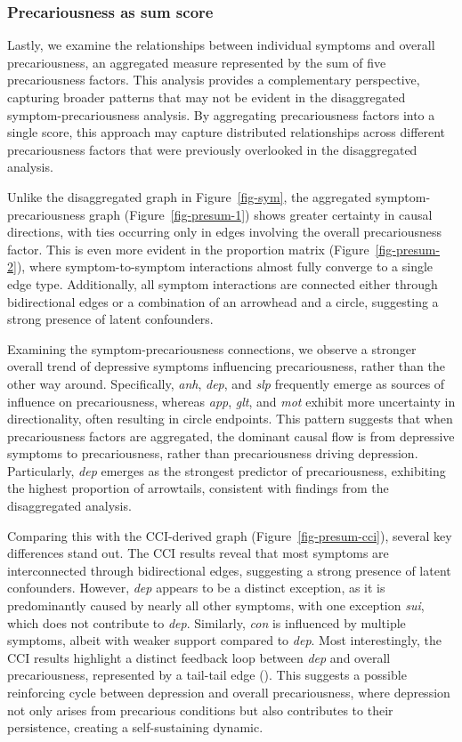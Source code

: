 \documentclass[
]{article}
\begin{document}
\subsubsection{Precariousness as sum
score}\label{precariousness-as-sum-score}

Lastly, we examine the relationships between individual symptoms and
overall precariousness, an aggregated measure represented by the sum of
five precariousness factors. This analysis provides a complementary
perspective, capturing broader patterns that may not be evident in the
disaggregated symptom-precariousness analysis. By aggregating
precariousness factors into a single score, this approach may capture
distributed relationships across different precariousness factors that
were previously overlooked in the disaggregated analysis.

Unlike the disaggregated graph in Figure~\ref{fig-sym}, the aggregated
symptom-precariousness graph (Figure~\ref{fig-presum-1}) shows greater
certainty in causal directions, with ties occurring only in edges
involving the overall precariousness factor. This is even more evident
in the proportion matrix (Figure~\ref{fig-presum-2}), where
symptom-to-symptom interactions almost fully converge to a single edge
type. Additionally, all symptom interactions are connected either
through bidirectional edges or a combination of an arrowhead and a
circle, suggesting a strong presence of latent confounders.

Examining the symptom-precariousness connections, we observe a stronger
overall trend of depressive symptoms influencing precariousness, rather
than the other way around. Specifically, \emph{anh}, \emph{dep}, and
\emph{slp} frequently emerge as sources of influence on precariousness,
whereas \emph{app}, \emph{glt}, and \emph{mot} exhibit more uncertainty
in directionality, often resulting in circle endpoints. This pattern
suggests that when precariousness factors are aggregated, the dominant
causal flow is from depressive symptoms to precariousness, rather than
precariousness driving depression. Particularly, \emph{dep} emerges as
the strongest predictor of precariousness, exhibiting the highest
proportion of arrowtails, consistent with findings from the
disaggregated analysis.

Comparing this with the CCI-derived graph (Figure~\ref{fig-presum-cci}),
several key differences stand out. The CCI results reveal that most
symptoms are interconnected through bidirectional edges, suggesting a
strong presence of latent confounders. However, \emph{dep} appears to be
a distinct exception, as it is predominantly caused by nearly all other
symptoms, with one exception \emph{sui}, which does not contribute to
\emph{dep}. Similarly, \emph{con} is influenced by multiple symptoms,
albeit with weaker support compared to \emph{dep}. Most interestingly,
the CCI results highlight a distinct feedback loop between \emph{dep}
and overall precariousness, represented by a tail-tail edge
(\textemdash ). This suggests a possible reinforcing cycle between
depression and overall precariousness, where depression not only arises
from precarious conditions but also contributes to their persistence,
creating a self-sustaining dynamic.
\end{document}
